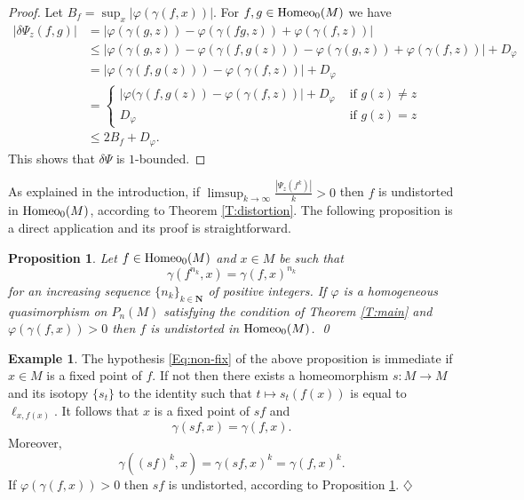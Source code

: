 \documentclass[11pt]{amsart}
\newtheorem{proposition}[subsection]{Proposition}
\theoremstyle{definition}
\newtheorem{example}[subsection]{Example}
\theoremstyle{remark}
\numberwithin{equation}{section}
\numberwithin{figure}{section}
\newcommand{\B}[1]{{\mathbf #1}}
\begin{document}
\begin{proof}
Let $B_f = \sup_{x}|\varphi(\gamma(f,x))|$.
For $f,g\in {\rm Homeo}_0(M)$ we have
\begin{align*}
|\delta\Psi_z(f,g)|
&=|\varphi(\gamma(g,z)) - \varphi(\gamma(fg,z)) + \varphi(\gamma(f,z))|\\
&\leq |\varphi(\gamma(g,z)) - \varphi(\gamma(f,g(z))) - \varphi(\gamma(g,z))+\varphi(\gamma(f,z))| + D_{\varphi}\\
&=|\varphi(\gamma(f,g(z))) - \varphi(\gamma(f,z)) | + D_{\varphi}\\
&=
\begin{cases}
|\varphi(\gamma(f,g(z))-\varphi(\gamma(f,z))|+D_{\varphi} &\text{ if } g(z)\neq z\\
D_{\varphi} &\text{ if } g(z)=z
\end{cases}\\
&\leq 2B_f+D_{\varphi}.
\end{align*}
This shows that $\delta\Psi$ is $1$-bounded.
\end{proof}

As explained in the introduction, if 
$\limsup_{k\to \infty}\frac{|\Psi_z(f^k)|}{k}>0$
then $f$ is undistorted in ${\rm Homeo}_0(M)$, 
according to Theorem \ref{T:distortion}.
The following proposition is a direct application
and its proof is straightforward.

\begin{proposition}\label{P:non-fix}
Let $f\in {\rm Homeo}_0(M)$ and $x\in M$ be such that
\begin{equation}
\gamma(f^{n_k},x) = \gamma(f,x)^{n_k}
\label{Eq:non-fix}
\end{equation}
for an increasing sequence $\{n_k\}_{k\in \B N}$ of positive integers.
If $\varphi$ is a homogeneous quasimorphism on $P_n(M)$ satisfying the
condition of Theorem \ref{T:main} and
$\varphi(\gamma(f,x))>0$ then $f$ is undistorted in ${\rm Homeo}_0(M)$.
\qed
\end{proposition}

\begin{example}\label{E:fix-point}
The hypothesis \eqref{Eq:non-fix} of the above proposition is immediate if
$x\in M$ is a fixed point of $f$. If not then there exists a homeomorphism
$s\colon M\to M$ and its isotopy $\{s_t\}$ to the identity such that
$t\mapsto s_t(f(x))$ is equal to $\ell_{x,f(x)}$. It follows that
$x$ is a fixed point of $sf$ and 
$$\gamma(sf,x) = \gamma(f,x).$$
Moreover, 
$$\gamma\left( (sf)^k,x \right) = \gamma(sf,x)^k = \gamma(f,x)^k.$$
If $\varphi(\gamma(f,x))>0$ then $sf$ is undistorted, according to
Proposition \ref{P:non-fix}.
\hfill $\diamondsuit$
\end{example}
\end{document}
